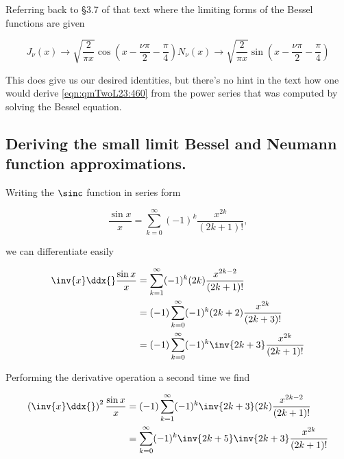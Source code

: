 Referring back to \S 3.7 of that text where the limiting forms of the Bessel functions are given

\begin{subequations}
\label{eqn:qmTwoL23:460}
\begin{equation}\label{eqn:qmTwoL23:460a}
J_\nu(x) \rightarrow \sqrt{\frac{2}{\pi x}} \cos\left(x - \frac{\nu\pi}{2} - \frac{\pi}{4} \right) 
\end{equation}
\begin{equation}\label{eqn:qmTwoL23:460b}
N_\nu(x) \rightarrow \sqrt{\frac{2}{\pi x}} \sin\left(x - \frac{\nu\pi}{2} - \frac{\pi}{4} \right)
\end{equation}
\end{subequations}

This does give us our desired identities, but there's no hint in the text how one would derive \ref{eqn:qmTwoL23:460} from the power series that was computed by solving the Bessel equation.

\subsection{Deriving the small limit Bessel and Neumann function approximations.}

Writing the $\sinc$ function in series form

\begin{equation}\label{eqn:qmTwoL23:800}
\frac{\sin x}{x} = \sum_{k=0}^\infty (-1)^k \frac{x^{2k}}{(2k + 1)!},
\end{equation}

we can differentiate easily

\begin{equation}\label{eqn:qmTwoL23:820}
\begin{aligned}
\inv{x} \ddx{} \frac{\sin x}{x}
&= \sum_{k=1}^\infty (-1)^k (2k) \frac{x^{2k-2}}{(2k + 1)!} \\
&= (-1) \sum_{k=0}^\infty (-1)^k (2k + 2) \frac{x^{2k}}{(2k + 3)!} \\
&= (-1) \sum_{k=0}^\infty (-1)^k \inv{2k + 3} \frac{x^{2k}}{(2k + 1)!} \\
\end{aligned}
\end{equation}

Performing the derivative operation a second time we find

\begin{equation}\label{eqn:qmTwoL23:840}
\begin{aligned}
\left(\inv{x} \ddx{}\right)^2 \frac{\sin x}{x}
&= (-1) \sum_{k=1}^\infty (-1)^k \inv{2k + 3} (2k) \frac{x^{2k-2}}{(2k + 1)!} \\
&= \sum_{k=0}^\infty (-1)^k \inv{2k + 5} \inv{2k + 3} \frac{x^{2k}}{(2k + 1)!}
\end{aligned}
\end{equation}

